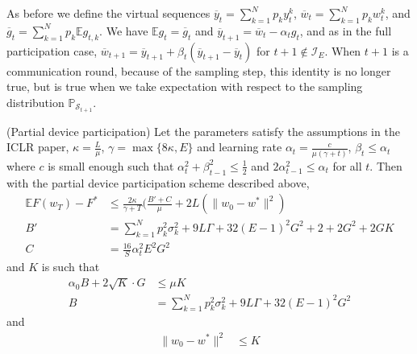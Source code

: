 As before we define the virtual sequences $\overline{y}_{t}=\sum_{k=1}^{N}p_{k}y_{t}^{k}$,
$\overline{w}_{t}=\sum_{k=1}^{N}p_{k}w_{t}^{k}$, and $\overline{g}_{t}=\sum_{k=1}^{N}p_{k}\mathbb{E}g_{t,k}$.
We have $\mathbb{E}g_{t}=\overline{g}_{t}$ and $\overline{y}_{t+1}=\overline{w}_{t}-\alpha_{t}g_{t}$,
and as in the full participation case, $\overline{w}_{t+1}=\overline{y}_{t+1}+\beta_{t}(\overline{y}_{t+1}-\overline{y}_{t})$
for $t+1\notin\mathcal{I}_{E}$. When $t+1$ is a communication round,
because of the sampling step, this identity is no longer true, but
is true when we take expectation with respect to the sampling distribution
$\mathbb{P}_{\mathcal{S}_{t+1}}$. 
\begin{theorem}
	(Partial device participation) Let the parameters satisfy the assumptions
	in the ICLR paper, $\kappa=\frac{L}{\mu}$, $\gamma=\max\{8\kappa,E\}$
	and learning rate $\alpha_{t}=\frac{c}{\mu(\gamma+t)}$, $\beta_{t}\leq\alpha_{t}$
	where $c$ is small enough such that $\alpha_{t}^{2}+\beta_{t-1}^{2}\leq\frac{1}{2}$
	and $2\alpha_{t-1}^{2}\leq\alpha_{t}$ for all $t$. Then with the
	partial device participation scheme described above,
	\begin{align*}
	\mathbb{E}F(w_{T})-F^{\ast} & \leq\frac{2\kappa}{\gamma+T}(\frac{B'+C}{\mu}+2L(\|w_{0}-w^{\ast}\|^{2})\\
	B' & =\sum_{k=1}^{N}p_{k}^{2}\sigma_{k}^{2}+9L\Gamma+32(E-1)^{2}G^{2}+2+2G^{2}+2GK\\
	C & =\frac{16}{S}\alpha_{t}^{2}E^{2}G^{2}
	\end{align*}
	and $K$ is such that 
	\begin{align*}
	\alpha_{0}B+2\sqrt{K}\cdot G & \leq\mu K\\
	B & =\sum_{k=1}^{N}p_{k}^{2}\sigma_{k}^{2}+9L\Gamma+32(E-1)^{2}G^{2}
	\end{align*}
	and
	\begin{align*}
	\|w_{0}-w^{\ast}\|^{2} & \leq K
	\end{align*}
\end{theorem}
%
